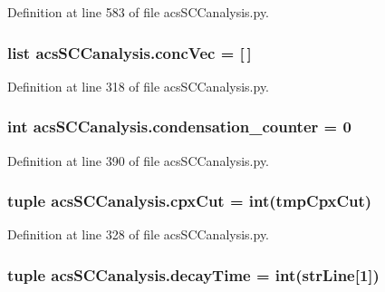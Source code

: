 Definition at line 583 of file acs\-S\-C\-Canalysis.\-py.

\hypertarget{a00102_a1681853ab5f5859e51f219caa07a8539}{
\subsubsection[{conc\-Vec}]{\setlength{\rightskip}{0pt plus 5cm}list acs\-S\-C\-Canalysis.\-conc\-Vec = \mbox{[}$\,$\mbox{]}}}\label{a00102_a1681853ab5f5859e51f219caa07a8539}


Definition at line 318 of file acs\-S\-C\-Canalysis.\-py.

\hypertarget{a00102_a144441bdbe6e835849cf165ea2946848}{
\subsubsection[{condensation\-\_\-counter}]{\setlength{\rightskip}{0pt plus 5cm}int acs\-S\-C\-Canalysis.\-condensation\-\_\-counter = 0}}\label{a00102_a144441bdbe6e835849cf165ea2946848}


Definition at line 390 of file acs\-S\-C\-Canalysis.\-py.

\hypertarget{a00102_a06673ec4592e44a89a443073b8a29011}{
\subsubsection[{cpx\-Cut}]{\setlength{\rightskip}{0pt plus 5cm}tuple acs\-S\-C\-Canalysis.\-cpx\-Cut = int(tmp\-Cpx\-Cut)}}\label{a00102_a06673ec4592e44a89a443073b8a29011}


Definition at line 328 of file acs\-S\-C\-Canalysis.\-py.

\hypertarget{a00102_a80a6d3cf3f4ccdc596054300761972a9}{
\subsubsection[{decay\-Time}]{\setlength{\rightskip}{0pt plus 5cm}tuple acs\-S\-C\-Canalysis.\-decay\-Time = int({\bf str\-Line}\mbox{[}1\mbox{]})}}\label{a00102_a80a6d3cf3f4ccdc596054300761972a9}


